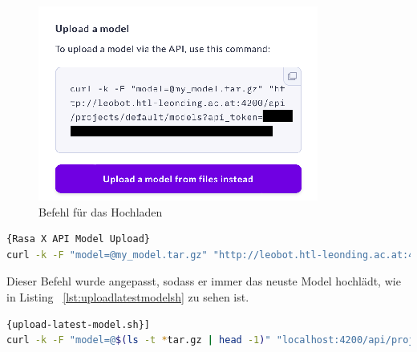 \begin{figure}[hbt!]
    \centering
    \includegraphics[scale=0.75]{pics/uploadmodel}
    \caption{Befehl für das Hochladen}
    \label{fig:impl:rasaxupload}
\end{figure}

\begin{lstlisting}[language=bash,label={lst:uploadlatestmodelshdefault},caption={Befehl zum Model Upload von Rasa X }]{Rasa X API Model Upload}
curl -k -F "model=@my_model.tar.gz" "http://leobot.htl-leonding.ac.at:4200/api/projects/default/models?api_token=TOKEN"
\end{lstlisting}

Dieser Befehl wurde angepasst, sodass er immer das neuste Model hochlädt, wie in Listing ~\ref{lst:uploadlatestmodelsh} zu sehen ist.

\begin{lstlisting}[language=bash,label={lst:uploadlatestmodelsh},caption={upload-latest-model.sh}]{upload-latest-model.sh}]
curl -k -F "model=@$(ls -t *tar.gz | head -1)" "localhost:4200/api/projects/default/models?api_token=TOKEN"
\end{lstlisting}

